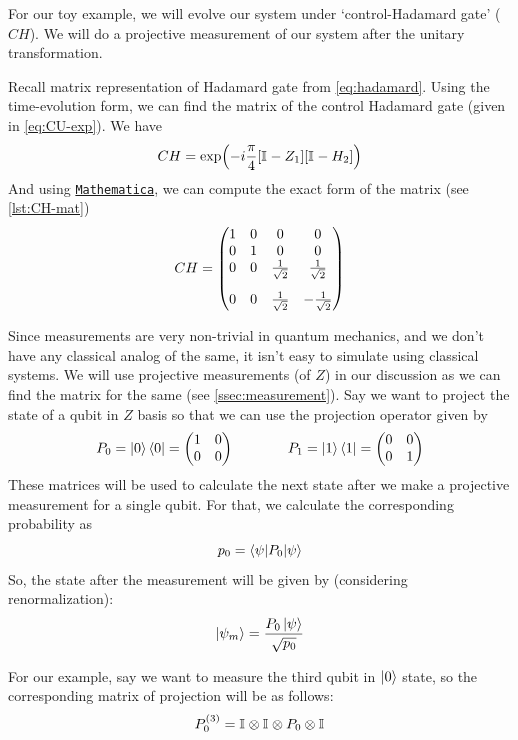 \documentclass[11pt, oneside, listof=totoc]{scrbook}
\renewcommand{\u}{0}
\renewcommand{\d}{1}
\newcommand{\ku}{\ket{0}}
\newcommand{\kd}{\ket{1}}
\begin{document}
\noindent For our toy example, we will evolve our system under `control-Hadamard gate' ($CH$). We will do a projective measurement of our system after the unitary transformation.

Recall matrix representation of Hadamard gate from \cref{eq:hadamard}. Using the time-evolution form, we can find the matrix of the control Hadamard gate (given in \cref{eq:CU-exp}). We have
\begin{equation*}
    CH = \exp(- i \frac{\pi}{4} [\mathbb{I}_{} - Z_1][\mathbb{I}_{} - H_2])
\end{equation*}
And using \href{https://www.wolfram.com/mathematica/}{\texttt{Mathematica}}, we can compute the exact form of the matrix (see \cref{lst:CH-mat})
\begin{equation}
    CH = \mqty(
    1 & 0 & 0 & 0 \\
    0 & 1 & 0 & 0 \\
    0 & 0 & \frac{1}{\sqrt{2}} & \frac{1}{\sqrt{2}} \\[2.5ex]
    0 & 0 & \frac{1}{\sqrt{2}} & - \frac{1}{\sqrt{2}}
    )
\end{equation}

Since measurements are very non-trivial in quantum mechanics, and we don't have any classical analog of the same, it isn't easy to simulate using classical systems. We will use projective measurements (of \(Z\)) in our discussion as we can find the matrix for the same (see \cref{ssec:measurement}). Say we want to project the state of a qubit in \(Z\) basis so that we can use the projection operator given by
\begin{equation*}
    P_{\u} = \ku \bra{\u} = \mqty(1 & 0 \\ 0 & 0) \qquad \qquad P_{\d} = \kd \bra{\d} = \mqty(0 & 0 \\ 0 & 1)
\end{equation*}
These matrices will be used to calculate the next state after we make a projective measurement for a single qubit. For that, we calculate the corresponding probability as
\begin{equation*}
    p_\u = \ev**{P_{\u}}{\psi}
\end{equation*}
So, the state after the measurement will be given by (considering renormalization):
\begin{equation}
    \ket{\psi_m} = \frac{{P_{\u}} \ket{\psi}}{\sqrt{p_\u}}
\end{equation}

For our example, say we want to measure the third qubit in \(\ku\) state, so the corresponding matrix of projection will be as follows:
\begin{equation*}
    P_{\u}^{(3)} = \I{} \otimes \I{} \otimes P_{\u} \otimes \I{}
\end{equation*}
\end{document}
